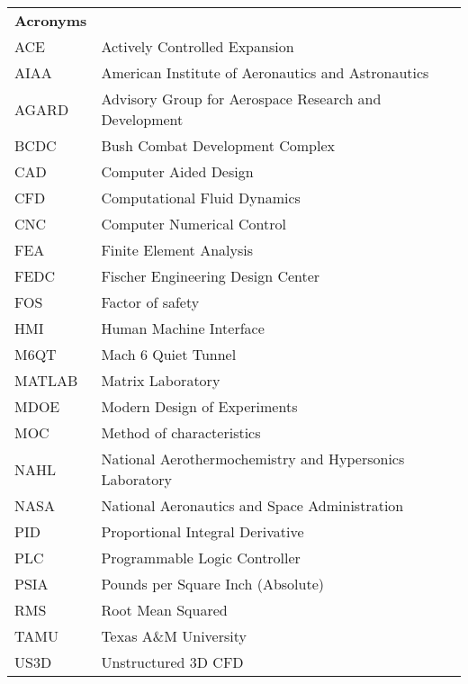 \begin{spacing}{1.0}
    \begin{longtable}[htbp]{@{}p{} p{}@{}}
       
        \textbf{Acronyms}\\ [2ex] 
		ACE	& Actively Controlled Expansion\\ [2ex] %
        AIAA & American Institute of Aeronautics and Astronautics \\ [2ex]
        AGARD & Advisory Group for Aerospace Research and Development \\ [2ex]
		BCDC & Bush Combat Development Complex\\ [2ex]
        CAD & Computer Aided Design\\ [2ex]
		CFD	& Computational Fluid Dynamics\\ [2ex] 
        CNC & Computer Numerical Control\\ [2ex]
		FEA & Finite Element Analysis\\	[2ex]
		FEDC & Fischer Engineering Design Center\\ [2ex]
        FOS & Factor of safety\\ [2ex]
        HMI & Human Machine Interface\\ [2ex]
        M6QT & Mach 6 Quiet Tunnel\\ [2ex]
        MATLAB & Matrix Laboratory\\ [2ex] 
        MDOE & Modern Design of Experiments\\ [2ex]
        MOC & Method of characteristics\\ [2ex]
		NAHL & National Aerothermochemistry and Hypersonics Laboratory\\ [2ex]
        NASA & National Aeronautics and Space Administration \\ [2ex]
        PID & Proportional Integral Derivative\\ [2ex]
        PLC & Programmable Logic Controller\\ [2ex]
        PSIA & Pounds per Square Inch (Absolute) \\ [2ex]
        RMS & Root Mean Squared \\ [2ex]
        TAMU & Texas A\&M University\\ [2ex]
        US3D & Unstructured 3D CFD \\ [2ex]


\end{longtable}
\end{spacing}
